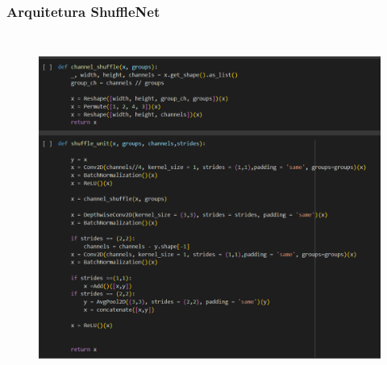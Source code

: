 \documentclass[aspectratio=169]{beamer}
\begin{document}







\begin{frame}
    \frametitle{Arquitetura ShuffleNet}



    \begin{columns}


        \hspace{-30px}

        \vspace{-30px}
        \begin{figure}
            \centering
            \includegraphics[scale = 0.4]{img/shuffleunits.png}
            \label{fig:enter-label}
        \end{figure}




\end{columns}
\end{frame}
\end{document}

